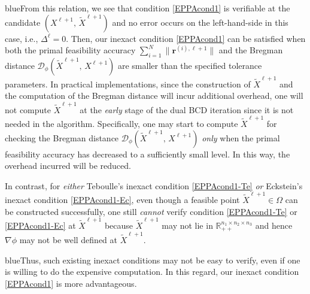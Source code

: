 \documentclass[10pt]{article}
\newcommand{\blue}[1]{\begin{color}{blue}#1\end{color}}
\begin{document}
\blue{From this relation, we see that condition \eqref{EPPAcond1} is verifiable at the candidate $(X^{\ell+1}, \,\widetilde{X}^{\ell+1})$ and no error occurs on the left-hand-side in this case, i.e., $\Delta^\ell=0$. Then, our inexact condition \eqref{EPPAcond1} can be satisfied when both the primal feasibility accuracy ${\textstyle\sum^N_{i=1}}\|\bm{r}^{(i),\ell+1}\|$ and the Bregman distance $\mathcal{D}_{\phi}(\widetilde{X}^{\ell+1}, \,X^{\ell+1})$ are smaller than the specified tolerance parameters. In practical implementations, since the construction of $\widetilde{X}^{\ell+1}$ and the computation of the Bregman distance will incur additional overhead, one will not compute $\widetilde{X}^{\ell+1}$ at the \textit{early} stage of the dual BCD iteration since it is not needed in the algorithm. Specifically, one may start to compute $\widetilde{X}^{\ell+1}$ for checking the Bregman distance $\mathcal{D}_{\phi}(\widetilde{X}^{\ell+1}, \,X^{\ell+1})$ \textit{only} when the primal feasibility accuracy has decreased to a sufficiently small level. In this way, the overhead incurred will be reduced.}

In contrast, for {\it either} Teboulle's inexact condition \eqref{EPPAcond1-Te} \textit{or} Eckstein's inexact condition \eqref{EPPAcond1-Ec}, even though a feasible point $\widetilde{X}^{\ell+1}\in\Omega$ can be constructed successfully, one still \textit{cannot} verify condition \eqref{EPPAcond1-Te} or \eqref{EPPAcond1-Ec} at $\widetilde{X}^{\ell+1}$ because $\widetilde{X}^{\ell+1}$ may not lie in $\mathbb{R}^{n_1\times n_2 \times n_3}_{++}$ and hence $\nabla\phi$ may not be well defined at $\widetilde{X}^{\ell+1}$. \blue{Thus, such existing inexact conditions may not be easy to verify, even if one is willing to do the expensive computation. In this regard, our inexact condition \eqref{EPPAcond1} is more advantageous.}
\end{document}
